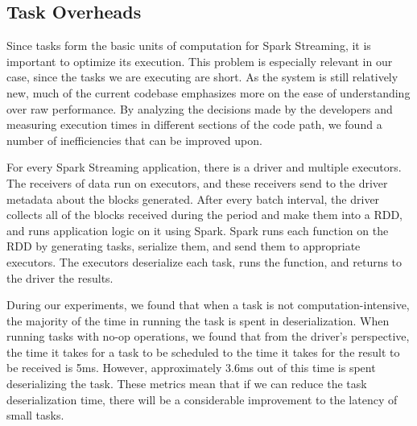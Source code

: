 \subsection{Task Overheads}
Since tasks form the basic units of computation for Spark Streaming, it is important to optimize its execution. This problem is especially relevant in our case, since the tasks we are executing are short. As the system is still relatively new, much of the current codebase emphasizes more on the ease of understanding over raw performance. By analyzing the decisions made by the developers and measuring execution times in different sections of the code path, we found a number of inefficiencies that can be improved upon.

For every Spark Streaming application, there is a driver and multiple executors. The receivers of data run on executors, and these receivers send to the driver metadata about the blocks generated. After every batch interval, the driver collects all of the blocks received during the period and make them into a RDD, and runs application logic on it using Spark. Spark runs each function on the RDD by generating tasks, serialize them, and send them to appropriate executors. The executors deserialize each task, runs the function, and returns to the driver the results.

During our experiments, we found that when a task is not computation-intensive, the majority of the time in running the task is spent in deserialization. When running tasks with no-op operations, we found that from the driver's perspective, the time it takes for a task to be scheduled to the time it takes for the result to be received is 5ms. However, approximately 3.6ms out of this time is spent deserializing the task. These metrics mean that if we can reduce the task deserialization time, there will be a considerable improvement to the latency of small tasks.

